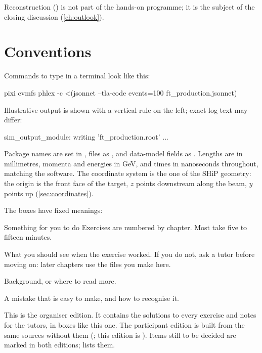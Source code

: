 Reconstruction () is not part of the hands-on programme; it is the
subject of the closing discussion (\cref{ch:outlook}).

\section*{Conventions}

Commands to type in a terminal look like this:
\begin{shell}
pixi cvmfs phlex -c <(jsonnet --tla-code events=100 ft_production.jsonnet)
\end{shell}
Illustrative output is shown with a vertical rule on the left; exact log text may differ:
\begin{outputlisting}
[info] sim_output_module: writing 'ft_production.root' ...
\end{outputlisting}

Package names are set in , files as ,
and data-model fields as . Lengths are in millimetres,
momenta and energies in GeV, and times in nanoseconds throughout, matching the
software. The coordinate system is the one of the SHiP geometry: the origin is
the front face of the target, $z$ points downstream along the beam, $y$
points up (\cref{sec:coordinates}).

The boxes have fixed meanings:

\begin{exercise}{Something for you to do}
Exercises are numbered by chapter. Most take five to fifteen minutes.
\end{exercise}

\begin{checkpoint}
What you should see when the exercise worked. If you do not, ask a tutor
before moving on: later chapters use the files you make here.
\end{checkpoint}

\begin{note}
Background, or where to read more.
\end{note}

\begin{pitfall}
A mistake that is easy to make, and how to recognise it.
\end{pitfall}

\iforganiser
\begin{organisernote}
This is the organiser edition. It contains the solutions to every exercise
and notes for the tutors, in boxes like this one. The participant edition is
built from the same sources without them (; this edition is
). Items still to be decided are marked
 in both editions;  lists them.
\end{organisernote}
\fi

